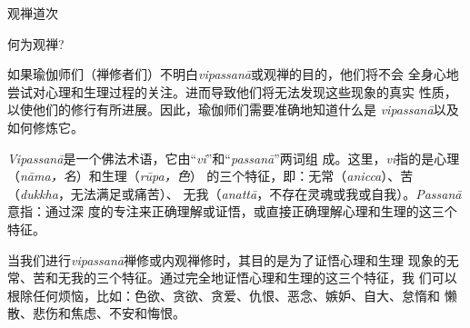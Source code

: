 


\beginchapter 观禅道次


\subsectnon \1何为观禅?

如果瑜伽师们（禅修者们）不明白{\it vipassan\=a\/}或观禅的目的，他们将不会
全身心地尝试对心理和生理过程的关注。进而导致他们将无法发现这些现象的真实
性质，以使他们的修行有所进展。因此，瑜伽师们需要准确地知道什么是{\it
vipassan\=a}以及如何修炼它。

{\it Vipassan\=a}是一个佛法术语，它由“{\it vi}”和“{\it passan\=a}”两词组
成。这里，{\it vi}指的是心理（{\it n\=ama，名}）和生理（{\it r\=upa，色}）
的三个特征，即：无常（{\it anicca}）、苦（{\it dukkha}，无法满足或痛苦）、
无我（{\it anatt\=a}，不存在灵魂或我或自我）。{\it Passan\=a}意指：通过深
度的专注来正确理解或证悟，或直接正确理解心理和生理的这三个特征。

当我们进行{\it vipassan\=a}禅修或内观禅修时，其目的是为了证悟心理和生理
现象的无常、苦和无我的三个特征。通过完全地证悟心理和生理的这三个特征，我
们可以根除任何烦恼，比如：色欲、贪欲、贪爱、仇恨、恶念、嫉妒、自大、怠惰和
懒散、悲伤和焦虑、不安和悔恨。

\endchapter

\byebye
